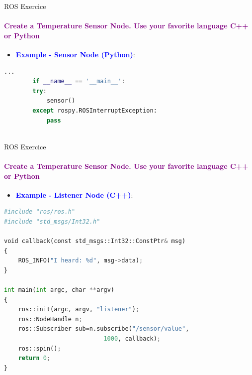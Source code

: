 \documentclass[aspectratio=169]{beamer}
\begin{document}
\begin{frame}[fragile]{ROS Exercice}
	\framesubtitle{\textcolor{purple}{Create a Temperature Sensor Node. Use your favorite language C++ or Python}}
	\begin{minipage}{0.6\textwidth}
	\begin{itemize}
		\item \textcolor{blue}{\textbf{Example - Sensor Node (Python)}}:
	\end{itemize}
	\begin{lstlisting}[language=Python]
		...
		if __name__ == '__main__':
		try:
			sensor()
		except rospy.ROSInterruptException:
			pass
	
    \end{lstlisting}
\end{minipage}
\begin{minipage}{0.4\textwidth}
	
\end{minipage}
\end{frame}


\begin{frame}[fragile]{ROS Exercice}
	\framesubtitle{\textcolor{purple}{Create a Temperature Sensor Node. Use your favorite language C++ or Python}}
	\begin{minipage}{0.6\textwidth}
	\begin{itemize}
		\item \textcolor{blue}{\textbf{Example - Listener Node (C++)}}:
	\end{itemize}
	\begin{lstlisting}[language=Python]
#include "ros/ros.h"
#include "std_msgs/Int32.h"

void callback(const std_msgs::Int32::ConstPtr& msg)
{
	ROS_INFO("I heard: %d", msg->data);
}

int main(int argc, char **argv)
{
	ros::init(argc, argv, "listener");
	ros::NodeHandle n;
	ros::Subscriber sub=n.subscribe("/sensor/value", 
							1000, callback);
	ros::spin();
	return 0;
}
	
    \end{lstlisting}
\end{minipage}
\begin{minipage}{0.4\textwidth}
	
\end{minipage}
\end{frame}
\end{document}
